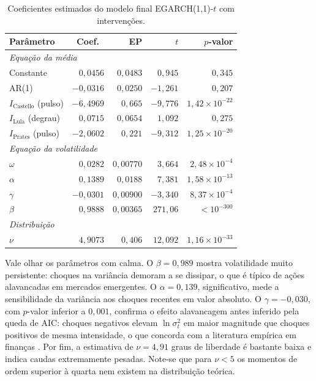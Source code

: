 \documentclass[12pt, a4paper]{article}
\begin{document}
\begin{table}[H]
\centering
\caption{Coeficientes estimados do modelo final EGARCH(1,1)-$t$ com intervenções.}
\label{tab:coefs}
\small
\begin{tabular}{lrrrr}
\toprule
Parâmetro & Coef.\ & EP & $t$ & $p$-valor \\
\midrule
\multicolumn{5}{l}{\textit{Equação da média}} \\
Constante                       & $0{,}0456$  & $0{,}0483$  & $0{,}945$   & $0{,}345$ \\
AR(1)                           & $-0{,}0316$ & $0{,}0250$  & $-1{,}261$  & $0{,}207$ \\
$I_{\text{Castello}}$ (pulso)   & $-6{,}4969$ & $0{,}665$   & $-9{,}776$  & $1{,}42 \times 10^{-22}$ \\
$I_{\text{Lula}}$ (degrau)      & $0{,}0715$  & $0{,}0654$  & $1{,}092$   & $0{,}275$ \\
$I_{\text{Prates}}$ (pulso)     & $-2{,}0602$ & $0{,}221$   & $-9{,}312$  & $1{,}25 \times 10^{-20}$ \\
\midrule
\multicolumn{5}{l}{\textit{Equação da volatilidade}} \\
$\omega$                        & $0{,}0282$  & $0{,}00770$ & $3{,}664$   & $2{,}48 \times 10^{-4}$ \\
$\alpha$                        & $0{,}1389$  & $0{,}0188$  & $7{,}381$   & $1{,}58 \times 10^{-13}$ \\
$\gamma$                        & $-0{,}0301$ & $0{,}00900$ & $-3{,}340$  & $8{,}37 \times 10^{-4}$ \\
$\beta$                         & $0{,}9888$  & $0{,}00365$ & $271{,}06$  & $< 10^{-300}$ \\
\midrule
\multicolumn{5}{l}{\textit{Distribuição}} \\
$\nu$                           & $4{,}9073$  & $0{,}406$   & $12{,}092$  & $1{,}16 \times 10^{-33}$ \\
\bottomrule
\end{tabular}
\end{table}

Vale olhar os parâmetros com calma. O $\beta = 0{,}989$ mostra volatilidade muito persistente: choques na variância demoram a se dissipar, o que é típico de ações alavancadas em mercados emergentes. O $\alpha = 0{,}139$, significativo, mede a sensibilidade da variância aos choques recentes em valor absoluto. O $\gamma = -0{,}030$, com $p$-valor inferior a $0{,}001$, confirma o efeito alavancagem antes inferido pela queda de AIC: choques negativos elevam $\ln \sigma_t^2$ em maior magnitude que choques positivos de mesma intensidade, o que concorda com a literatura empírica em finanças \cite{morettin2017}. Por fim, a estimativa de $\nu = 4{,}91$ graus de liberdade é bastante baixa e indica caudas extremamente pesadas. Note-se que para $\nu < 5$ os momentos de ordem superior à quarta nem existem na distribuição teórica.
\end{document}
